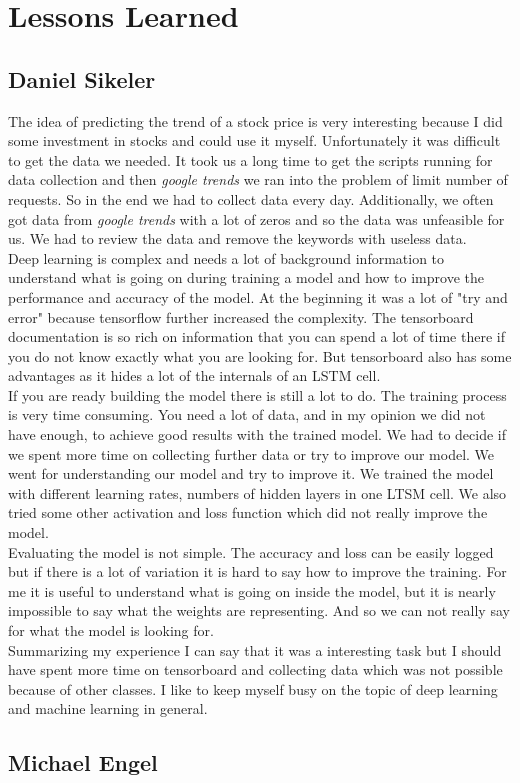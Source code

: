 \section{Lessons Learned}
\label{sec:lessonslearned}

\subsection{Daniel Sikeler}
\label{sec:llDS}
The idea of predicting the trend of a stock price is very interesting because I did some investment in stocks and could use it myself. Unfortunately it was difficult to get the data we needed. It took us a long time to get the scripts running for data collection and then \textit{google trends} we ran into the problem of limit number of requests. So in the end we had to collect data every day. Additionally, we often got data from \textit{google trends} with a lot of zeros and so the data was unfeasible for us. We had to review the data and remove the keywords with useless data.\\
Deep learning is complex and needs a lot of background information to understand what is going on during training a model and how to improve the performance and accuracy of the model. At the beginning it was a lot of "try and error" because tensorflow further increased the complexity. The tensorboard documentation is so rich on information that you can spend a lot of time there if you do not know exactly what you are looking for. But tensorboard also has some advantages as it hides a lot of the internals of an LSTM cell.\\
If you are ready building the model there is still a lot to do. The training process is very time consuming. You need a lot of data, and in my opinion we did not have enough, to achieve good results with the trained model. We had to decide if we spent more time on collecting further data or try to improve our model. We went for understanding our model and try to improve it. We trained the model with different learning rates, numbers of hidden layers in one LTSM cell. We also tried some other activation and loss function which did not really improve the model.\\
Evaluating the model is not simple. The accuracy and loss can be easily logged but if there is a lot of variation it is hard to say how to improve the training. For me it is useful to understand what is going on inside the model, but it is nearly impossible to say what the weights are representing. And so we can not really say for what the model is looking for.\\
Summarizing my experience I can say that it was a interesting task but I should have spent more time on tensorboard and collecting data which was not possible because of other classes. I like to keep myself busy on the topic of deep learning and machine learning in general. 

\subsection{Michael Engel}
\label{sec:llME}


